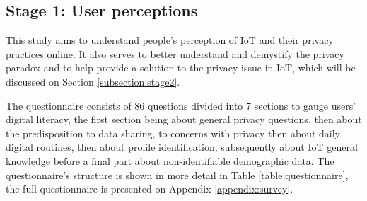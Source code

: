 
\subsection{Stage 1: User perceptions}

This study aims to understand people's perception of IoT and their privacy
practices online. It also serves to better understand and demystify the privacy
paradox and to help provide a solution to the privacy issue in IoT, which will be
discussed on Section \ref{subsection:stage2}.

The questionnaire consists of 86 questions divided into 7 sections to
gauge users' digital literacy, the first section being about general privacy
questions, then about the predisposition to data sharing, to concerns with
privacy then about daily digital routines, then about profile identification,
subsequently about IoT general knowledge before a final part about
non-identifiable demographic data. The questionnaire's structure is shown
in more detail in Table \ref{table:questionnaire}, the full questionnaire
is presented on Appendix \ref{appendix:survey}.


